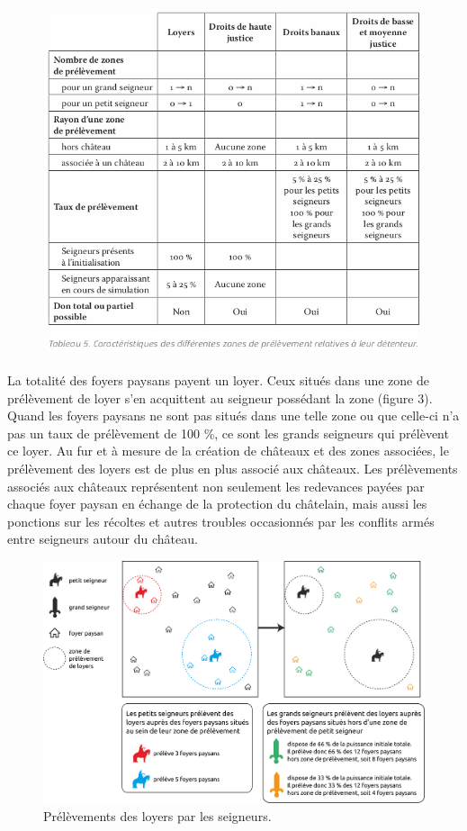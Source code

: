 \documentclass[12pt, a4paper, oneside]{book}
\begin{document}
	\begin{figure}[H]
		\centering
		\includegraphics[width=1\linewidth]{src/Chapitre_TMD/Tab5.png}
	\end{figure}
	

	
	La totalité des foyers paysans payent un loyer.
	Ceux situés dans une zone de prélèvement de loyer s'en acquittent au seigneur possédant la zone (figure 3).
	Quand les foyers paysans ne sont pas situés dans une telle zone ou que celle-ci n'a pas un taux de prélèvement de 100 \%, ce sont les grands seigneurs qui prélèvent ce loyer.
	Au fur et à mesure de la création de châteaux et des zones associées, le prélèvement des loyers est de plus en plus associé aux châteaux.
	Les prélèvements associés aux châteaux représentent non seulement les redevances payées par chaque foyer paysan en échange de la protection du châtelain, mais aussi les ponctions sur les récoltes et autres troubles occasionnés par les conflits armés entre seigneurs autour du château.
	
	\begin{figure}[H]
		\centering
		\includegraphics[width=1\linewidth]{src/Chapitre_TMD/Fig3}
		\caption{Prélèvements des loyers par les seigneurs.}
		\label{fig:fig3}
	\end{figure}
	
\end{document}
